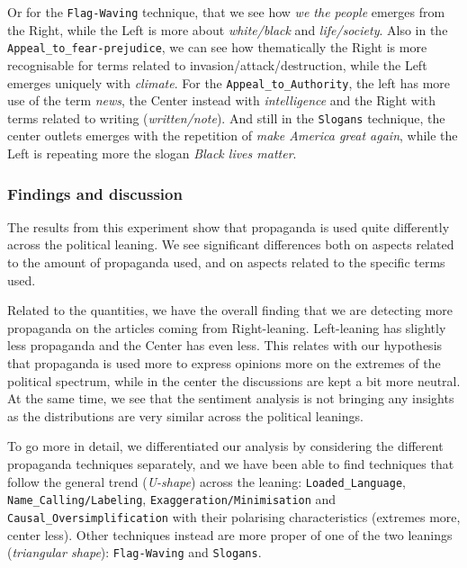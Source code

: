 Or for the \texttt{Flag-Waving} technique, that we see how \emph{we the people} emerges from the Right, while the Left is more about \emph{white/black} and \emph{life/society}.
Also in the \texttt{Appeal\_to\_fear-prejudice}, we can see how thematically the Right is more recognisable for terms related to invasion/attack/destruction, while the Left emerges uniquely with \emph{climate}.
For the \texttt{Appeal\_to\_Authority}, the left has more use of the term \emph{news}, the Center instead with \emph{intelligence} and the Right with terms related to writing (\emph{written/note}).
And still in the \texttt{Slogans} technique, the center outlets emerges with the repetition of \emph{make America great again}, while the Left is repeating more the slogan \emph{Black lives matter}.

\subsubsection{Findings and discussion}

The results from this experiment show that propaganda is used quite differently across the political leaning.
We see significant differences both on aspects related to the amount of propaganda used, and on aspects related to the specific terms used.

Related to the quantities, we have the overall finding that we are detecting more propaganda on the articles coming from Right-leaning.
Left-leaning has slightly less propaganda and the Center has even less.
This relates with our hypothesis that propaganda is used more to express opinions more on the extremes of the political spectrum, while in the center the discussions are kept a bit more neutral.
At the same time, we see that the sentiment analysis is not bringing any insights as the distributions are very similar across the political leanings.

To go more in detail, we differentiated our analysis by considering the different propaganda techniques separately, and we have been able to find techniques that follow the general trend (\emph{U-shape}) across the leaning: \texttt{Loaded\_Language}, \texttt{Name\_Calling/Labeling}, \texttt{Exaggeration/Minimisation} and \texttt{Causal\_Oversimplification} with their polarising characteristics (extremes more, center less). Other techniques instead are more proper of one of the two leanings (\emph{triangular shape}): \texttt{Flag-Waving} and \texttt{Slogans}. 



